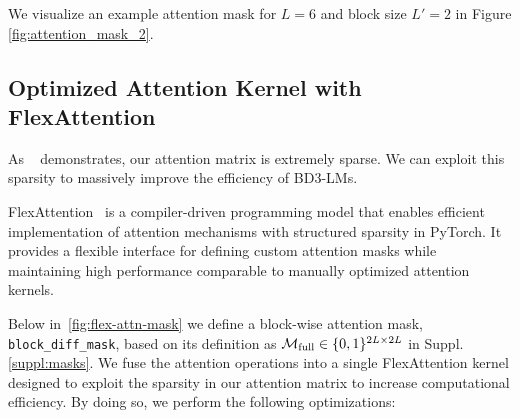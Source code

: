 \documentclass{article} %
\def\algos{BD3-LMs}
\begin{document}
We visualize an example attention mask for $L = 6$ and block size $L' = 2$ in Figure \ref{fig:attention_mask_2}.




% 
% 


\subsection{Optimized Attention Kernel with FlexAttention}\label{suppl:flex-attention-kernels}

As ~ demonstrates, our attention matrix is extremely sparse. We can exploit this sparsity to massively improve the efficiency of \algos{}.

FlexAttention~\citep{dong2024flex} is a compiler-driven programming model that enables efficient implementation of attention mechanisms with structured sparsity in PyTorch. It provides a flexible interface for defining custom attention masks while maintaining high performance comparable to manually optimized attention kernels.

Below in~\cref{fig:flex-attn-mask} we define a block-wise attention mask, \texttt{block\_diff\_mask}, based on its definition as $\mathcal{M}_{\text{full}} \in \{0, 1\}^{2L \times 2L}$ in Suppl. \ref{suppl:masks}. We fuse the attention operations into a single FlexAttention kernel designed to exploit the sparsity in our attention matrix to increase computational efficiency. By doing so, we perform the following optimizations:
\end{document}
